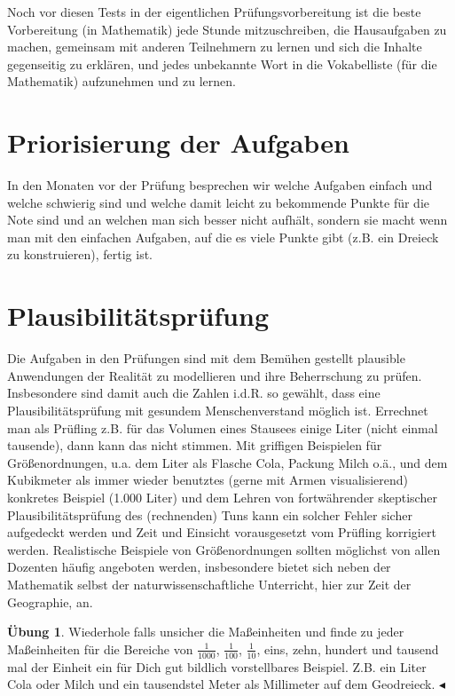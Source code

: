 \documentclass[a4paper]{book}%
\newcommand{\topicend}{
      $\blacktriangleleft$
}
\theoremstyle{definition}
\newtheorem{uebung}{Übung}
\begin{document}
Noch vor diesen Tests in der eigentlichen Prüfungsvorbereitung ist die beste Vorbereitung (in Mathematik) jede Stunde mitzuschreiben, die Hausaufgaben zu machen, gemeinsam mit anderen Teilnehmern zu lernen und sich die Inhalte gegenseitig zu erklären, und jedes unbekannte Wort in die Vokabelliste (für die Mathematik) aufzunehmen und zu lernen.


\section{Priorisierung der Aufgaben}

In den Monaten vor der Prüfung besprechen wir welche Aufgaben einfach und welche schwierig sind und welche damit leicht zu bekommende Punkte für die Note sind und an welchen man sich besser nicht aufhält, sondern sie macht wenn man mit den einfachen Aufgaben, auf die es viele Punkte gibt (z.B. ein Dreieck zu konstruieren), fertig ist.


\section{Plausibilitätsprüfung}

Die Aufgaben in den Prüfungen sind mit dem Bemühen gestellt plausible Anwendungen der Realität zu modellieren und ihre Beherrschung zu prüfen. Insbesondere sind damit auch die Zahlen i.d.R. so gewählt, dass eine Plausibilitätsprüfung mit gesundem Menschenverstand möglich ist. Errechnet man als Prüfling z.B. für das Volumen eines Stausees einige Liter (nicht einmal tausende), dann kann das nicht stimmen. Mit griffigen Beispielen für Größenordnungen, u.a. dem Liter als Flasche Cola, Packung Milch o.ä., und dem Kubikmeter als immer wieder benutztes (gerne mit Armen visualisierend) konkretes Beispiel (1.000 Liter) und dem Lehren von fortwährender skeptischer Plausibilitätsprüfung des (rechnenden) Tuns kann ein solcher Fehler sicher aufgedeckt werden und Zeit und Einsicht vorausgesetzt vom Prüfling korrigiert werden. Realistische Beispiele von Größenordnungen sollten möglichst von allen Dozenten häufig angeboten werden, insbesondere bietet sich neben der Mathematik selbst der naturwissenschaftliche Unterricht, hier zur Zeit der Geographie, an.

\begin{uebung}
    Wiederhole falls unsicher die Maßeinheiten und finde zu jeder Maßeinheiten für die Bereiche von $\frac{1}{1000}$, $\frac{1}{100}$, $\frac{1}{10}$, eins, zehn, hundert und tausend mal der Einheit ein für Dich gut bildlich vorstellbares Beispiel. Z.B. ein Liter Cola oder Milch und ein tausendstel Meter als Millimeter auf dem Geodreieck.\topicend
\end{uebung}
\end{document}
